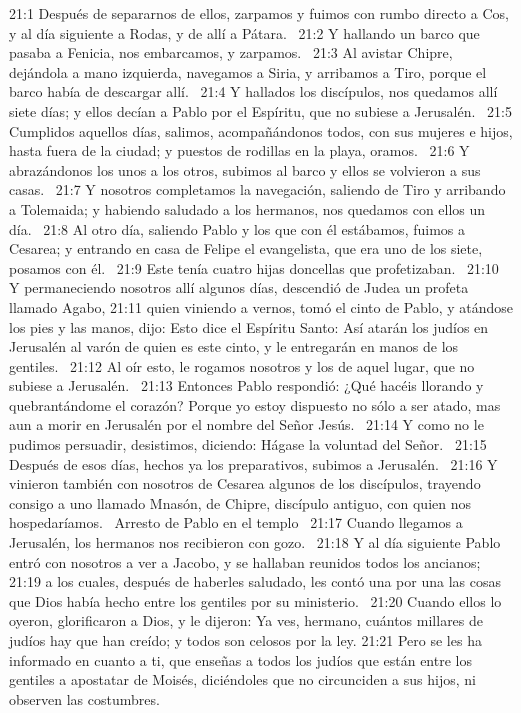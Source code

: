 21:1 Después de separarnos de ellos, zarpamos y fuimos con rumbo directo a Cos, y al día siguiente a Rodas, y de allí a Pátara.  
21:2 Y hallando un barco que pasaba a Fenicia, nos embarcamos, y zarpamos.  
21:3 Al avistar Chipre, dejándola a mano izquierda, navegamos a Siria, y arribamos a Tiro, porque el barco había de descargar allí.  
21:4 Y hallados los discípulos, nos quedamos allí siete días; y ellos decían a Pablo por el Espíritu, que no subiese a Jerusalén.  
21:5 Cumplidos aquellos días, salimos, acompañándonos todos, con sus mujeres e hijos, hasta fuera de la ciudad; y puestos de rodillas en la playa, oramos.  
21:6 Y abrazándonos los unos a los otros, subimos al barco y ellos se volvieron a sus casas.  
21:7 Y nosotros completamos la navegación, saliendo de Tiro y arribando a Tolemaida; y habiendo saludado a los hermanos, nos quedamos con ellos un día.  
21:8 Al otro día, saliendo Pablo y los que con él estábamos, fuimos a Cesarea; y entrando en casa de Felipe el evangelista, que era uno de los siete, posamos con él.  
21:9 Este tenía cuatro hijas doncellas que profetizaban.  
21:10 Y permaneciendo nosotros allí algunos días, descendió de Judea un profeta llamado Agabo, 
21:11 quien viniendo a vernos, tomó el cinto de Pablo, y atándose los pies y las manos, dijo: Esto dice el Espíritu Santo: Así atarán los judíos en Jerusalén al varón de quien es este cinto, y le entregarán en manos de los gentiles.  
21:12 Al oír esto, le rogamos nosotros y los de aquel lugar, que no subiese a Jerusalén.  
21:13 Entonces Pablo respondió: ¿Qué hacéis llorando y quebrantándome el corazón? Porque yo estoy dispuesto no sólo a ser atado, mas aun a morir en Jerusalén por el nombre del Señor Jesús.  
21:14 Y como no le pudimos persuadir, desistimos, diciendo: Hágase la voluntad del Señor.  
21:15 Después de esos días, hechos ya los preparativos, subimos a Jerusalén.  
21:16 Y vinieron también con nosotros de Cesarea algunos de los discípulos, trayendo consigo a uno llamado Mnasón, de Chipre, discípulo antiguo, con quien nos hospedaríamos.  
Arresto de Pablo en el templo  
21:17 Cuando llegamos a Jerusalén, los hermanos nos recibieron con gozo.  
21:18 Y al día siguiente Pablo entró con nosotros a ver a Jacobo, y se hallaban reunidos todos los ancianos;  
21:19 a los cuales, después de haberles saludado, les contó una por una las cosas que Dios había hecho entre los gentiles por su ministerio.  
21:20 Cuando ellos lo oyeron, glorificaron a Dios, y le dijeron: Ya ves, hermano, cuántos millares de judíos hay que han creído; y todos son celosos por la ley. 
21:21 Pero se les ha informado en cuanto a ti, que enseñas a todos los judíos que están entre los gentiles a apostatar de Moisés, diciéndoles que no circunciden a sus hijos, ni observen las costumbres.  
